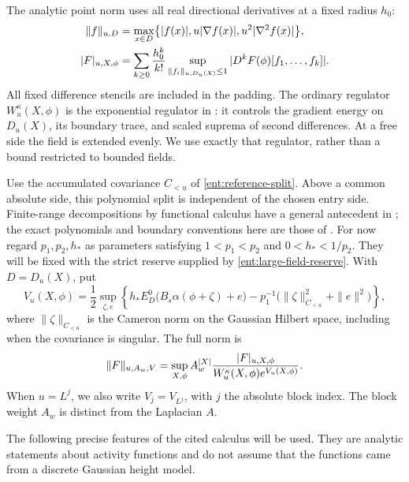 The analytic point norm uses all real directional derivatives at a
fixed radius \(h_0\):
\begin{equation}\label{eq:point-norm}
 \begin{split}
 \lVert f\rVert_{u,D}
 &=\max_{x\in D}\bigl\{|f(x)|,u|\nabla f(x)|,
                                      u^2|\nabla^2f(x)|\bigr\},\\
 |F|_{u,X,\phi}
 &=\sum_{k\ge0}\frac{h_0^k}{k!}
       \sup_{\lVert f_i\rVert_{u,D_u(X)}\le1}
       |D^kF(\phi)[f_1,\ldots,f_k]|.
 \end{split}
\end{equation}
All fixed difference stencils are included in the padding.
The ordinary regulator \(W_u^\kappa(X,\phi)\) is the exponential
regulator in \cite[Equation~(4.10)]{B}: it controls the gradient
energy on \(D_u(X)\), its boundary trace, and scaled suprema of
second differences.  At a free side the field is extended evenly.
We use exactly that regulator, rather than a bound restricted to
bounded fields.

Use the accumulated covariance \(C_{<u}\) of
\eqref{ent:reference-split}.  Above a common absolute side, this
polynomial split is independent of the chosen entry side.
Finite-range decompositions by functional calculus have a general
antecedent in \cite{Bauerschmidt2013}; the exact polynomials and
boundary conventions here are those of \cite{B}.
For now regard \(p_1,p_2,h_*\) as parameters satisfying
\(1<p_1<p_2\) and \(0<h_*<1/p_2\).  They will be fixed with the
strict reserve supplied by \eqref{ent:large-field-reserve}.
With \(D=D_u(X)\), put
\begin{equation}\label{eq:observation-regulator}
 V_u(X,\phi)=\frac12\sup_{\zeta,e}
 \left\{h_* E_D^0\bigl(B_s\alpha(\phi+\zeta)+e\bigr)
 -p_1^{-1}\bigl(\|\zeta\|_{C_{<u}}^2+\|e\|^2\bigr)\right\},
\end{equation}
where \(\|\zeta\|_{C_{<u}}\) is the Cameron norm on the Gaussian
Hilbert space, including when the covariance is singular.  The full norm is
\begin{equation}\label{eq:activity-norm}
 \lVert F\rVert_{u,A_w,V}
 =\sup_{X,\phi}
  A_w^{|X|}\frac{|F|_{u,X,\phi}}
                 {W_u^\kappa(X,\phi)e^{V_u(X,\phi)}}.
\end{equation}
When \(u=L^j\), we also write \(V_j=V_{L^j}\), with \(j\) the
absolute block index.
The block weight \(A_w\) is distinct from the Laplacian \(A\).

The following precise features of the cited calculus will be used.
They are analytic statements about activity functions and do not
assume that the functions came from a discrete Gaussian height model.

